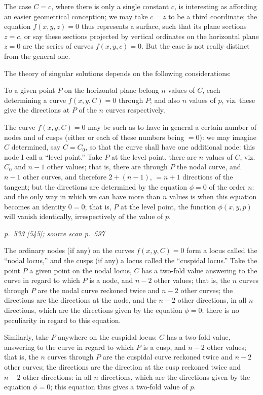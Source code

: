 \documentclass[11pt,a4paper]{article}
\newcommand{\sourcepage}[3]{%
  \bigskip
  \noindent\textit{p.~#1 [#2]; source scan p.~#3}%
  \par\smallskip
}
\begin{document}
The case $C=c$, where there is only a single constant $c$, is interesting as affording
an easier geometrical conception; we may take $c=z$ to be a third coordinate; the
equation $f(x,y,z)=0$ thus represents a surface, such that its plane sections $z=c$, or
say these sections projected by vertical ordinates on the horizontal plane $z=0$ are the
series of curves $f(x,y,c)=0$. But the case is not really distinct from the general one.

The theory of singular solutions depends on the following considerations:

To a given point $P$ on the horizontal plane belong $n$ values of $C$, each determining
a curve $f(x,y,C)=0$ through $P$; and also $n$ values of $p$, viz. these give the
directions at $P$ of the $n$ curves respectively.

The curve $f(x,y,C)=0$ may be such as to have in general a certain number
of nodes and of cusps (either or each of these numbers being $=0$): we may imagine $C$
determined, say $C=C_0$, so that the curve shall have one additional node: this node I
call a ``level point.'' Take $P$ at the level point, there are $n$ values of $C$, viz. $C_0$ and
$n-1$ other values; that is, there are through $P$ the nodal curve, and $n-1$ other
curves, and therefore $2+(n-1)$, $=n+1$ directions of the tangent; but the directions
are determined by the equation $\phi=0$ of the order $n$: and the only way in which
we can have more than $n$ values is when this equation becomes an identity $0=0$;
that is, $P$ at the level point, the function $\phi(x,y,p)$ will vanish identically, irrespectively
of the value of $p$.

\clearpage

\sourcepage{533}{545}{597}
The ordinary nodes (if any) on the curves $f(x,y,C)=0$ form a locus called the
``nodal locus,'' and the cusps (if any) a locus called the ``cuspidal locus.'' Take the
point $P$ a given point on the nodal locus, $C$ has a two-fold value answering to the
curve in regard to which $P$ is a node, and $n-2$ other values; that is, the $n$ curves
through $P$ are the nodal curve reckoned twice and $n-2$ other curves; the directions
are the directions at the node, and the $n-2$ other directions, in all $n$ directions, which
are the directions given by the equation $\phi=0$; there is no peculiarity in regard to
this equation.

Similarly, take $P$ anywhere on the cuspidal locus: $C$ has a two-fold value, answering
to the curve in regard to which $P$ is a cusp, and $n-2$ other values; that is, the
$n$ curves through $P$ are the cuspidal curve reckoned twice and $n-2$ other curves;
the directions are the direction at the cusp reckoned twice and $n-2$ other directions:
in all $n$ directions, which are the directions given by the equation $\phi=0$; this equation
thus gives a two-fold value of $p$.
\end{document}
